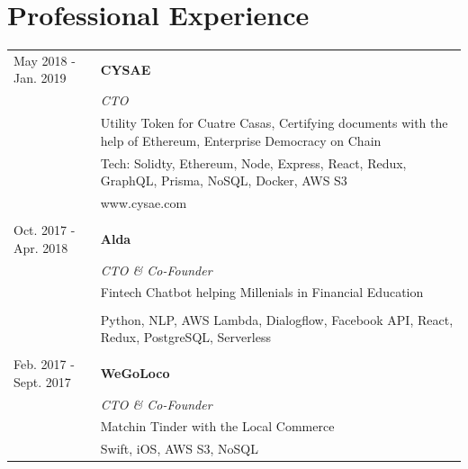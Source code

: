 \documentclass[11pt]{article}
\begin{document}
\section*{Professional Experience}
\begin{tabularx}{\textwidth}{lX}
  May 2018 - Jan. 2019   & \textbf{CYSAE} \\
                         & \textit{CTO} \\[1mm]
                         & Utility Token for Cuatre Casas, Certifying documents with the help of
                           Ethereum, Enterprise Democracy on Chain\\
                         & Tech: Solidty, Ethereum, Node, Express, React, Redux,
                           GraphQL, Prisma, NoSQL, Docker,  AWS S3 \\
                         & www.cysae.com  \\\\
  Oct. 2017 - Apr. 2018  & \textbf{Alda} \\
                         & \textit{CTO \& Co-Founder} \\[1mm]
                         & Fintech Chatbot helping Millenials in Financial Education\\\\
                         & Python, NLP, AWS Lambda, Dialogflow, Facebook API, React,
                           Redux, PostgreSQL, Serverless \\\\
  Feb. 2017 - Sept. 2017 & \textbf{WeGoLoco} \\
                         & \textit{CTO \& Co-Founder} \\[1mm]
                         & Matchin Tinder with the Local Commerce \\
                         & Swift, iOS, AWS S3, NoSQL 

  
  
  
  

\end{tabularx}
\end{document}
